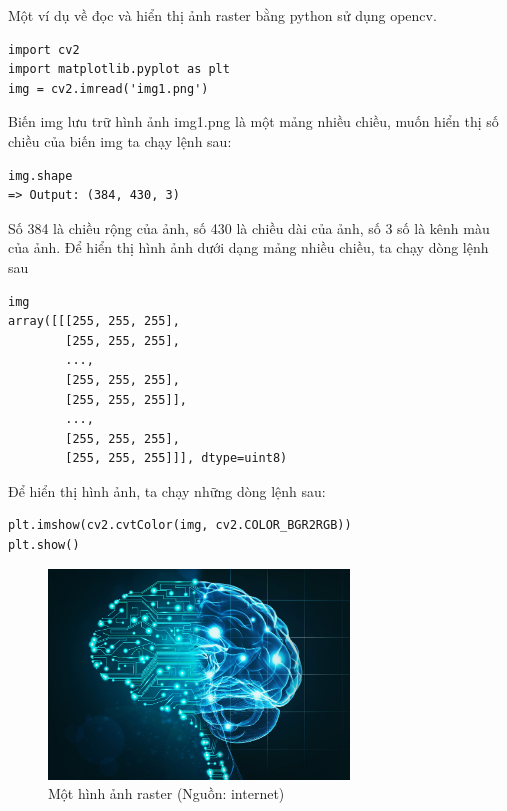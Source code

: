 \noindent Một ví dụ về đọc và hiển thị ảnh raster bằng python sử dụng opencv.
\vspace{-0.4cm}
\begin{verbatim}
import cv2
import matplotlib.pyplot as plt
img = cv2.imread('img1.png')
\end{verbatim} 
\vspace{-0.4cm}
Biến img lưu trữ hình ảnh img1.png là một mảng nhiều chiều, muốn hiển thị số chiều của biến img ta chạy lệnh sau:
\vspace{-0.4cm}
\begin{verbatim}
img.shape
=> Output: (384, 430, 3)
\end{verbatim} 
\vspace{-0.4cm}
Số 384 là chiều rộng của ảnh, số 430 là chiều dài của ảnh, số 3 số là kênh màu  của ảnh.
Để hiển thị hình ảnh dưới dạng mảng nhiều chiều, ta chạy dòng lệnh sau
\vspace{-0.4cm}
\begin{verbatim}
img
array([[[255, 255, 255],
        [255, 255, 255],
        ...,
        [255, 255, 255],
        [255, 255, 255]],
        ...,
        [255, 255, 255],
        [255, 255, 255]]], dtype=uint8)
\end{verbatim} 
\vspace{-0.4cm}
Để hiển thị hình ảnh, ta chạy những dòng lệnh sau:
\vspace{-0.3cm}
\begin{verbatim}
plt.imshow(cv2.cvtColor(img, cv2.COLOR_BGR2RGB))
plt.show()
\end{verbatim} 
\vspace{-0.4cm}

\begin{figure}[H]
    \centering
    \includegraphics[width=8cm]{images/medicine/img10.jpg}
    \caption{Một hình ảnh raster (Nguồn: internet)}
\end{figure}

